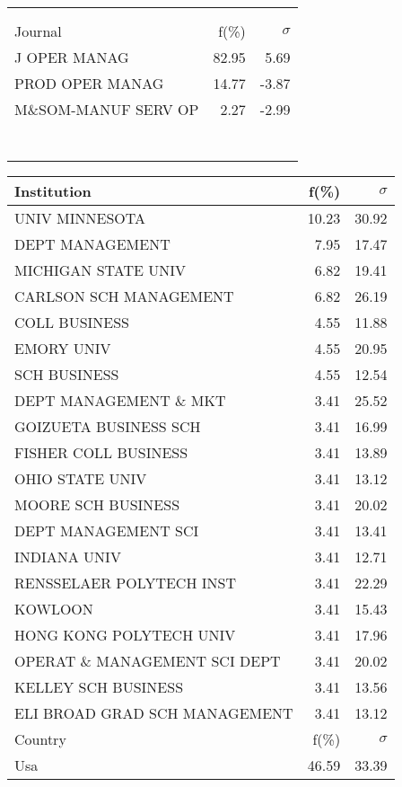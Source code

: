 \documentclass[a4paper,11pt]{report}
\begin{document}
\begin{landscape}
\begin{table}[!ht]
{\begin{tabular}{|l r  r|}
 &  & \\
 &  & \\
\hline
\hline
Journal & f(\%) & $\sigma$\\
\hline
J OPER MANAG & 82.95 & 5.69\\
PROD OPER MANAG & 14.77 & -3.87\\
M\&SOM-MANUF SERV OP & 2.27 & -2.99\\
 &  & \\
 &  & \\
 &  & \\
 &  & \\
 &  & \\
 &  & \\
 &  & \\
\hline
\end{tabular}
}
{\scriptsize\begin{tabular}{|l r r|}
\hline
Institution & f(\%) & $\sigma$\\
\hline
UNIV MINNESOTA & 10.23 & 30.92\\
DEPT MANAGEMENT & 7.95 & 17.47\\
MICHIGAN STATE UNIV & 6.82 & 19.41\\
CARLSON SCH MANAGEMENT & 6.82 & 26.19\\
COLL BUSINESS & 4.55 & 11.88\\
EMORY UNIV & 4.55 & 20.95\\
SCH BUSINESS & 4.55 & 12.54\\
DEPT MANAGEMENT \& MKT & 3.41 & 25.52\\
GOIZUETA BUSINESS SCH & 3.41 & 16.99\\
FISHER COLL BUSINESS & 3.41 & 13.89\\
OHIO STATE UNIV & 3.41 & 13.12\\
MOORE SCH BUSINESS & 3.41 & 20.02\\
DEPT MANAGEMENT SCI & 3.41 & 13.41\\
INDIANA UNIV & 3.41 & 12.71\\
RENSSELAER POLYTECH INST & 3.41 & 22.29\\
KOWLOON & 3.41 & 15.43\\
HONG KONG POLYTECH UNIV & 3.41 & 17.96\\
OPERAT \& MANAGEMENT SCI DEPT & 3.41 & 20.02\\
KELLEY SCH BUSINESS & 3.41 & 13.56\\
ELI BROAD GRAD SCH MANAGEMENT & 3.41 & 13.12\\
\hline
\hline
Country & f(\%) & $\sigma$\\
\hline
Usa & 46.59 & 33.39\\

\end{tabular}}
\end{table}
\end{landscape}
\end{document}
